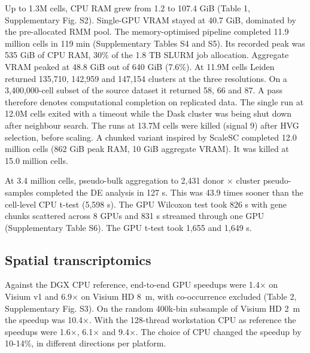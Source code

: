 \documentclass[runningheads]{llncs}
\begin{document}
Up to 1.3M cells, CPU RAM grew from 1.2 to 107.4 GiB (Table 1, Supplementary Fig. S2).
Single-GPU VRAM stayed at 40.7 GiB, dominated by the pre-allocated RMM pool.
The memory-optimised pipeline completed 11.9 million cells in 119 min (Supplementary Tables S4 and S5).
Its recorded peak was 535 GiB of CPU RAM, 30\% of the 1.8 TB SLURM job allocation.
Aggregate VRAM peaked at 48.8 GiB out of 640 GiB (7.6\%).
At 11.9M cells Leiden returned 135,710, 142,959 and 147,154 clusters at the three resolutions.
On a 3,400,000-cell subset of the source dataset it returned 58, 66 and 87.
A pass therefore denotes computational completion on replicated data.
The single run at 12.0M cells exited with a timeout while the Dask cluster was being shut down after neighbour search.
The runs at 13.7M cells were killed (signal 9) after HVG selection, before scaling.
A chunked variant inspired by ScaleSC \cite{Hu2025} completed 12.0 million cells (862 GiB peak RAM, 10 GiB aggregate VRAM).
It was killed at 15.0 million cells.

At 3.4 million cells, pseudo-bulk aggregation to 2,431 donor $\times$ cluster pseudo-samples completed the DE analysis in 127 s.
This was 43.9 times sooner than the cell-level CPU t-test (5,598 s).
The GPU Wilcoxon test took 826 s with gene chunks scattered across 8 GPUs and 831 s streamed through one GPU (Supplementary Table S6).
The GPU t-test took 1,655 and 1,649 s.

\hypertarget{spatial-transcriptomics-1}{%
\subsection{Spatial transcriptomics}\label{spatial-transcriptomics-1}}

Against the DGX CPU reference, end-to-end GPU speedups were 1.4$\times$ on Visium v1 and 6.9$\times$ on Visium HD 8~\textmu{}m, with co-occurrence excluded (Table 2, Supplementary Fig. S3).
On the random 400k-bin subsample of Visium HD 2~\textmu{}m the speedup was 10.4$\times$.
With the 128-thread workstation CPU as reference the speedups were 1.6$\times$, 6.1$\times$ and 9.4$\times$.
The choice of CPU changed the speedup by 10-14\%, in different directions per platform.
\end{document}
